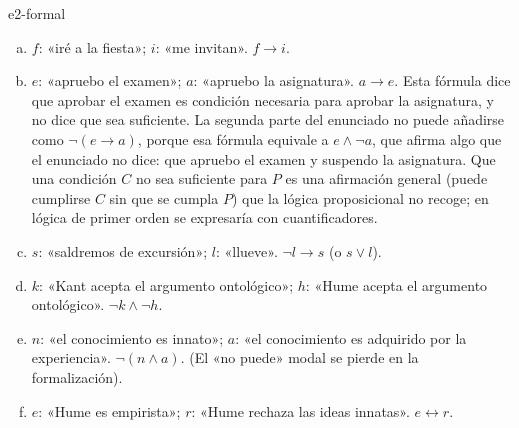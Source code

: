 \begin{solucion}{e2-formal}
\begin{enumerate}[(a)]
    \item $f$: «iré a la fiesta»; $i$: «me invitan». $f \to i$.
    \item $e$: «apruebo el examen»; $a$: «apruebo la asignatura». $a \to e$. Esta fórmula dice que aprobar el examen es condición necesaria para aprobar la asignatura, y no dice que sea suficiente. La segunda parte del enunciado no puede añadirse como $\neg(e \to a)$, porque esa fórmula equivale a $e \land \neg a$, que afirma algo que el enunciado no dice: que apruebo el examen y suspendo la asignatura. Que una condición $C$ no sea suficiente para $P$ es una afirmación general (puede cumplirse $C$ sin que se cumpla $P$) que la lógica proposicional no recoge; en lógica de primer orden se expresaría con cuantificadores.
    \item $s$: «saldremos de excursión»; $l$: «llueve». $\neg l \to s$ (o $s \lor l$).
    \item $k$: «Kant acepta el argumento ontológico»; $h$: «Hume acepta el argumento ontológico». $\neg k \land \neg h$.
    \item $n$: «el conocimiento es innato»; $a$: «el conocimiento es adquirido por la experiencia». $\neg(n \land a)$. (El «no puede» modal se pierde en la formalización).
    \item $e$: «Hume es empirista»; $r$: «Hume rechaza las ideas innatas». $e \leftrightarrow r$.
\end{enumerate}
\end{solucion}

